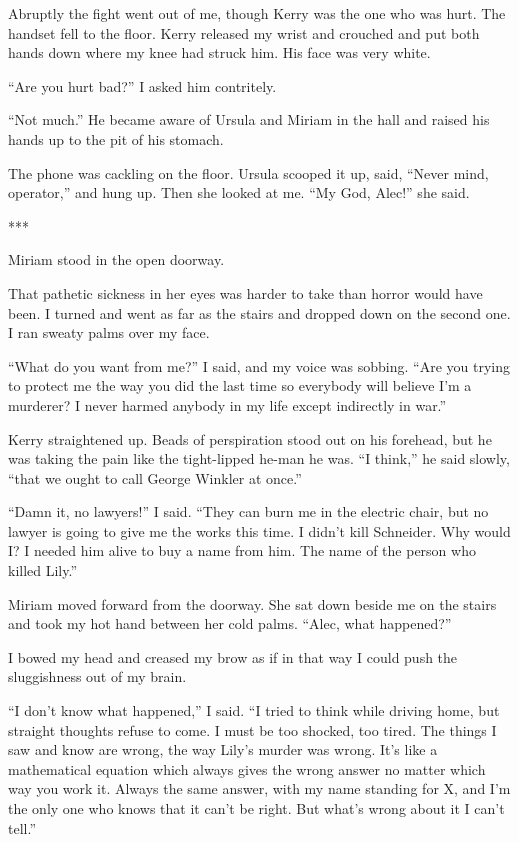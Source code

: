\documentclass{novel}
\begin{document}
{Abruptly the fight went out of me, though Kerry was the one who was hurt. The handset fell to the floor. Kerry released my wrist and crouched and put both hands down where my knee had struck him. His face was very white.

“Are you hurt bad?” I asked him contritely.

“Not much.” He became aware of Ursula and Miriam in the hall and raised his hands up to the pit of his stomach.

The phone was cackling on the floor. Ursula scooped it up, said, “Never mind, operator,” and hung up. Then she looked at me. “My God, Alec!” she said.

***

Miriam stood in the open doorway.

That pathetic sickness in her eyes was harder to take than horror would have been. I turned and went as far as the stairs and dropped down on the second one. I ran sweaty palms over my face.

“What do you want from me?” I said, and my voice was sobbing. “Are you trying to protect me the way you did the last time so everybody will believe I’m a murderer? I never harmed anybody in my life except indirectly in war.”

Kerry straightened up. Beads of perspiration stood out on his forehead, but he was taking the pain like the tight-lipped he-man he was. “I think,” he said slowly, “that we ought to call George Winkler at once.”

“Damn it, no lawyers!” I said. “They can burn me in the electric chair, but no lawyer is going to give me the works this time. I didn’t kill Schneider. Why would I? I needed him alive to buy a name from him. The name of the person who killed Lily.”

Miriam moved forward from the doorway. She sat down beside me on the stairs and took my hot hand between her cold palms. “Alec, what happened?”

I bowed my head and creased my brow as if in that way I could push the sluggishness out of my brain.

“I don’t know what happened,” I said. “I tried to think while driving home, but straight thoughts refuse to come. I must be too shocked, too tired. The things I saw and know are wrong, the way Lily’s murder was wrong. It’s like a mathematical equation which always gives the wrong answer no matter which way you work it. Always the same answer, with my name standing for X, and I’m the only one who knows that it can’t be right. But what’s wrong about it I can’t tell.”

}
\end{document}
